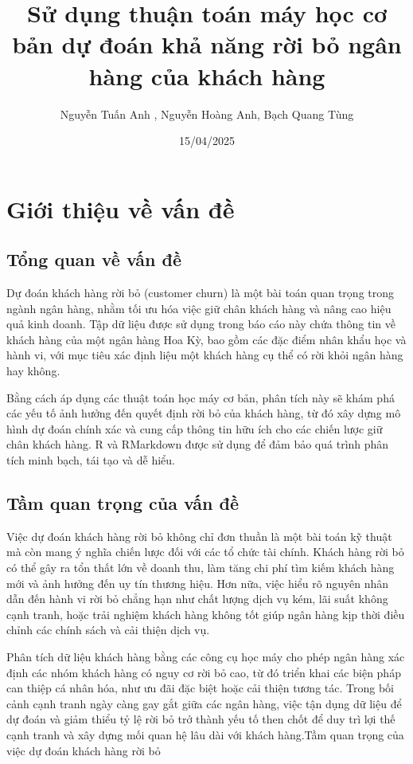 \documentclass[
]{article}
\title{Sử dụng thuận toán máy học cơ bản dự đoán khả năng rời bỏ ngân
hàng của khách hàng}
\author{Nguyễn Tuấn Anh , Nguyễn Hoàng Anh, Bạch Quang Tùng}
\date{15/04/2025}
\begin{document}
\maketitle

{
\setcounter{tocdepth}{3}
\tableofcontents
}
\section{Giới thiệu về vấn đề}\label{sec-intro}

\subsection{Tổng quan về vấn đề}\label{sec-r}

Dự đoán khách hàng rời bỏ (customer churn) là một bài toán quan trọng
trong ngành ngân hàng, nhằm tối ưu hóa việc giữ chân khách hàng và nâng
cao hiệu quả kinh doanh. Tập dữ liệu được sử dụng trong báo cáo này chứa
thông tin về khách hàng của một ngân hàng Hoa Kỳ, bao gồm các đặc điểm
nhân khẩu học và hành vi, với mục tiêu xác định liệu một khách hàng cụ
thể có rời khỏi ngân hàng hay không.

Bằng cách áp dụng các thuật toán học máy cơ bản, phân tích này sẽ khám
phá các yếu tố ảnh hưởng đến quyết định rời bỏ của khách hàng, từ đó xây
dựng mô hình dự đoán chính xác và cung cấp thông tin hữu ích cho các
chiến lược giữ chân khách hàng. R và RMarkdown được sử dụng để đảm bảo
quá trình phân tích minh bạch, tái tạo và dễ hiểu.

\subsection{Tầm quan trọng của vấn đề}\label{sec-importance}

Việc dự đoán khách hàng rời bỏ không chỉ đơn thuần là một bài toán kỹ
thuật mà còn mang ý nghĩa chiến lược đối với các tổ chức tài chính.
Khách hàng rời bỏ có thể gây ra tổn thất lớn về doanh thu, làm tăng chi
phí tìm kiếm khách hàng mới và ảnh hưởng đến uy tín thương hiệu. Hơn
nữa, việc hiểu rõ nguyên nhân dẫn đến hành vi rời bỏ chẳng hạn như chất
lượng dịch vụ kém, lãi suất không cạnh tranh, hoặc trải nghiệm khách
hàng không tốt giúp ngân hàng kịp thời điều chỉnh các chính sách và cải
thiện dịch vụ.

Phân tích dữ liệu khách hàng bằng các công cụ học máy cho phép ngân hàng
xác định các nhóm khách hàng có nguy cơ rời bỏ cao, từ đó triển khai các
biện pháp can thiệp cá nhân hóa, như ưu đãi đặc biệt hoặc cải thiện
tương tác. Trong bối cảnh cạnh tranh ngày càng gay gắt giữa các ngân
hàng, việc tận dụng dữ liệu để dự đoán và giảm thiểu tỷ lệ rời bỏ trở
thành yếu tố then chốt để duy trì lợi thế cạnh tranh và xây dựng mối
quan hệ lâu dài với khách hàng.Tầm quan trọng của việc dự đoán khách
hàng rời bỏ
\end{document}
